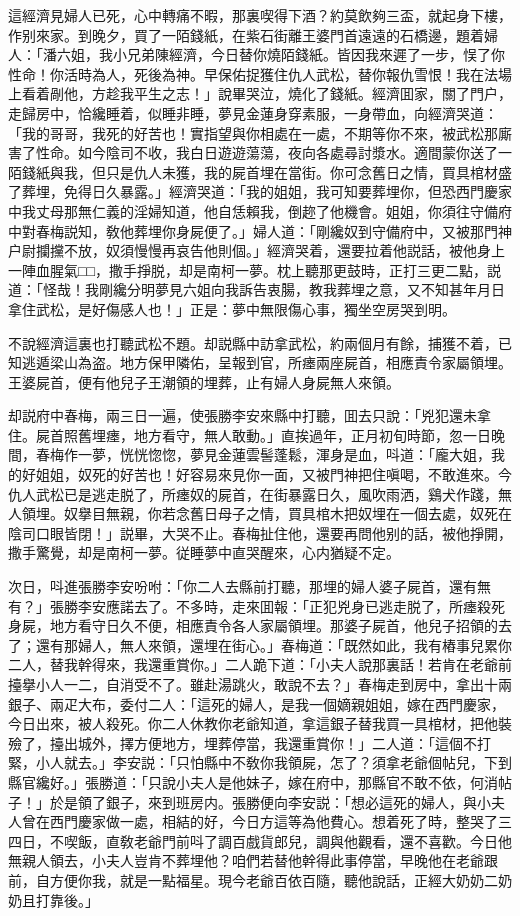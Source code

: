 這經濟見婦人已死，心中轉痛不暇，那裏喫得下酒？約莫飲夠三盃，就起身下樓，作别來家。到晚夕，買了一陌錢紙，在紫石街離王婆門首遠遠的石橋邊，題着婦人：「潘六姐，我小兄弟陳經濟，今日替你燒陌錢紙。皆因我來遲了一步，悮了你性命！你活時為人，死後為神。早保佑捉獲住仇人武松，替你報仇雪恨！我在法場上看着剮他，方趁我平生之志！」說畢哭泣，燒化了錢紙。經濟囬家，關了門户，走歸房中，恰纔睡着，似睡非睡，夢見金蓮身穿素服，一身帶血，向經濟哭道：「我的哥哥，我死的好苦也！實指望與你相處在一處，不期等你不來，被武松那廝害了性命。如今陰司不收，我白日遊遊蕩蕩，夜向各處尋討漿水。適間蒙你送了一陌錢紙與我，但只是仇人未獲，我的屍首埋在當街。你可念舊日之情，買具棺材盛了葬埋，免得日久暴露。」經濟哭道：「我的姐姐，我可知要葬埋你，但恐西門慶家中我丈母那無仁義的淫婦知道，他自恁賴我，倒趂了他機會。姐姐，你須往守備府中對春梅説知，敎他葬埋你身屍便了。」婦人道：「剛纔奴到守備府中，又被那門神户尉攔攩不放，奴須慢慢再哀告他則個。」經濟哭着，還要拉着他説話，被他身上一陣血腥氣□□，撒手掙脱，却是南柯一夢。枕上聽那更鼓時，正打三更二點，説道：「怪哉！我剛纔分明夢見六姐向我訴告衷腸，教我葬埋之意，又不知甚年月日拿住武松，是好傷感人也！」正是：夢中無限傷心事，獨坐空房哭到明。

不說經濟這裏也打聽武松不題。却説縣中訪拿武松，約兩個月有餘，捕獲不着，已知逃遁梁山為盗。地方保甲隣佑，呈報到官，所瘗兩座屍首，相應責令家屬領埋。王婆屍首，便有他兒子王潮領的埋葬，止有婦人身屍無人來領。

却説府中春梅，兩三日一遍，使張勝李安來縣中打聽，囬去只說：「兇犯還未拿住。屍首照舊埋瘗，地方看守，無人敢動。」直挨過年，正月初旬時節，忽一日晚間，春梅作一夢，恍恍惚惚，夢見金蓮雲髻蓬鬆，渾身是血，呌道：「龐大姐，我的好姐姐，奴死的好苦也！好容易來見你一面，又被門神把住嗔喝，不敢進來。今仇人武松已是逃走脱了，所瘗奴的屍首，在街暴露日久，風吹雨洒，鷄犬作踐，無人領埋。奴擧目無親，你若念舊日母子之情，買具棺木把奴埋在一個去處，奴死在陰司口眼皆閉！」説畢，大哭不止。春梅扯住他，還要再問他别的話，被他掙開，撒手驚覺，却是南柯一夢。従睡夢中直哭醒來，心内猶疑不定。

次日，呌進張勝李安吩咐：「你二人去縣前打聽，那埋的婦人婆子屍首，還有無有？」張勝李安應諾去了。不多時，走來囬報：「正犯兇身已逃走脱了，所瘗殺死身屍，地方看守日久不便，相應責令各人家屬領埋。那婆子屍首，他兒子招領的去了；還有那婦人，無人來領，還埋在街心。」春梅道：「既然如此，我有樁事兒累你二人，替我幹得來，我還重賞你。」二人跪下道：「小夫人說那裏話！若肯在老爺前擡擧小人一二，自消受不了。雖赴湯跳火，敢說不去？」春梅走到房中，拿出十兩銀子、兩疋大布，委付二人：「這死的婦人，是我一個嫡親姐姐，嫁在西門慶家，今日出來，被人殺死。你二人休教你老爺知道，拿這銀子替我買一具棺材，把他裝殮了，擡出城外，擇方便地方，埋葬停當，我還重賞你！」二人道：「這個不打緊，小人就去。」李安説：「只怕縣中不敎你我領屍，怎了？須拿老爺個帖兒，下到縣官纔好。」張勝道：「只說小夫人是他妹子，嫁在府中，那縣官不敢不依，何消帖子！」於是領了銀子，來到班房内。張勝便向李安説：「想必這死的婦人，與小夫人曾在西門慶家做一處，相結的好，今日方這等為他費心。想着死了時，整哭了三四日，不喫飯，直敎老爺門前呌了調百戲貨郎兒，調與他觀看，還不喜歡。今日他無親人領去，小夫人豈肯不葬埋他？咱們若替他幹得此事停當，早晚他在老爺跟前，自方便你我，就是一點福星。現今老爺百依百隨，聽他說話，正經大奶奶二奶奶且打靠後。」

